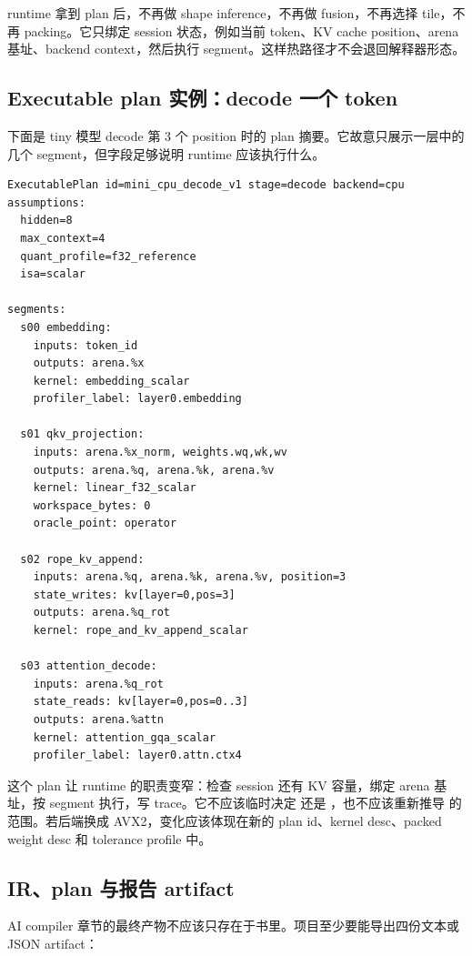 runtime 拿到 plan 后，不再做 shape inference，不再做 fusion，不再选择 tile，不再 packing。它只绑定 session 状态，例如当前 token、KV cache position、arena 基址、backend context，然后执行 segment。这样热路径才不会退回解释器形态。

\subsection{Executable plan 实例：decode 一个 token}

下面是 tiny 模型 decode 第 3 个 position 时的 plan 摘要。它故意只展示一层中的几个 segment，但字段足够说明 runtime 应该执行什么。

\begin{lstlisting}[numbers=none,caption={MiniLLM-CPU decode executable plan 摘要}]
ExecutablePlan id=mini_cpu_decode_v1 stage=decode backend=cpu
assumptions:
  hidden=8
  max_context=4
  quant_profile=f32_reference
  isa=scalar

segments:
  s00 embedding:
    inputs: token_id
    outputs: arena.%x
    kernel: embedding_scalar
    profiler_label: layer0.embedding

  s01 qkv_projection:
    inputs: arena.%x_norm, weights.wq,wk,wv
    outputs: arena.%q, arena.%k, arena.%v
    kernel: linear_f32_scalar
    workspace_bytes: 0
    oracle_point: operator

  s02 rope_kv_append:
    inputs: arena.%q, arena.%k, arena.%v, position=3
    state_writes: kv[layer=0,pos=3]
    outputs: arena.%q_rot
    kernel: rope_and_kv_append_scalar

  s03 attention_decode:
    inputs: arena.%q_rot
    state_reads: kv[layer=0,pos=0..3]
    outputs: arena.%attn
    kernel: attention_gqa_scalar
    profiler_label: layer0.attn.ctx4
\end{lstlisting}

这个 plan 让 runtime 的职责变窄：检查 session 还有 KV 容量，绑定 arena 基址，按 segment 执行，写 trace。它不应该临时决定  还是 ，也不应该重新推导  的范围。若后端换成 AVX2，变化应该体现在新的 plan id、kernel desc、packed weight desc 和 tolerance profile 中。

\subsection{IR、plan 与报告 artifact}

AI compiler 章节的最终产物不应该只存在于书里。项目至少要能导出四份文本或 JSON artifact：

